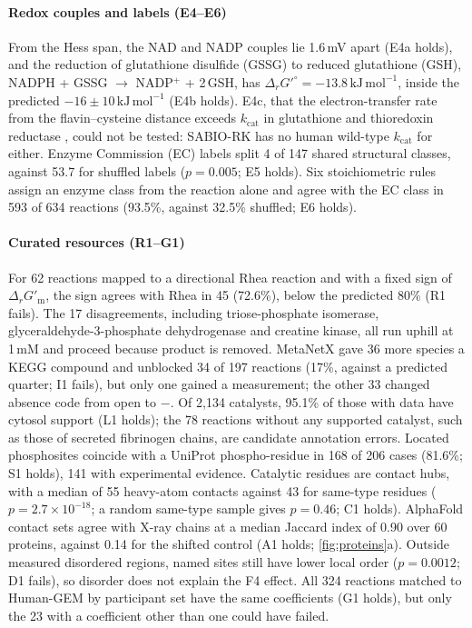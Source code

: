 \documentclass[5p]{elsarticle}
\theoremstyle{definition}
\theoremstyle{plain}
\newcommand{\kJ}{\ensuremath{\,\mathrm{kJ\,mol^{-1}}}}
\newcommand{\DGp}{\ensuremath{\Delta_r G'^\circ}}
\newcommand{\DGm}{\ensuremath{\Delta_r G'_{\mathrm{m}}}}
\begin{document}
\paragraph{Redox couples and labels (E4--E6)}
From the Hess span, the NAD and NADP couples lie 1.6\,mV apart (E4a holds), and the reduction of glutathione disulfide (GSSG) to reduced glutathione (GSH), NADPH + GSSG $\to$ NADP$^+$ + 2\,GSH, has $\DGp=-13.8\kJ$, inside the predicted $-16\pm10\kJ$ (E4b holds).
E4c, that the electron-transfer rate from the flavin--cysteine distance exceeds $k_{\mathrm{cat}}$ in glutathione and thioredoxin reductase \citep{moser1992nature,page1999natural}, could not be tested: SABIO-RK has no human wild-type $k_{\mathrm{cat}}$ for either.
Enzyme Commission (EC) labels split 4 of 147 shared structural classes, against 53.7 for shuffled labels ($p=0.005$; E5 holds).
Six stoichiometric rules assign an enzyme class from the reaction alone and agree with the EC class in 593 of 634 reactions (93.5\%, against 32.5\% shuffled; E6 holds).

\paragraph{Curated resources (R1--G1)}
For 62 reactions mapped to a directional Rhea reaction and with a fixed sign of \DGm, the sign agrees with Rhea in 45 (72.6\%), below the predicted 80\% (R1 fails).
The 17 disagreements, including triose-phosphate isomerase, glyceraldehyde-3-phosphate dehydrogenase and creatine kinase, all run uphill at 1\,mM and proceed because product is removed.
MetaNetX gave 36 more species a KEGG compound and unblocked 34 of 197 reactions (17\%, against a predicted quarter; I1 fails), but only one gained a measurement; the other 33 changed absence code from \textsf{open} to $-$.
Of 2{,}134 catalysts, 95.1\% of those with data have cytosol support (L1 holds); the 78 reactions without any supported catalyst, such as those of secreted fibrinogen chains, are candidate annotation errors.
Located phosphosites coincide with a UniProt phospho-residue in 168 of 206 cases (81.6\%; S1 holds), 141 with experimental evidence.
Catalytic residues are contact hubs, with a median of 55 heavy-atom contacts against 43 for same-type residues ($p=2.7\times10^{-18}$; a random same-type sample gives $p=0.46$; C1 holds).
AlphaFold contact sets agree with X-ray chains at a median Jaccard index of 0.90 over 60 proteins, against 0.14 for the shifted control (A1 holds; \cref{fig:proteins}a).
Outside measured disordered regions, named sites still have lower local order ($p=0.0012$; D1 fails), so disorder does not explain the F4 effect.
All 324 reactions matched to Human-GEM by participant set have the same coefficients (G1 holds), but only the 23 with a coefficient other than one could have failed.
\end{document}
